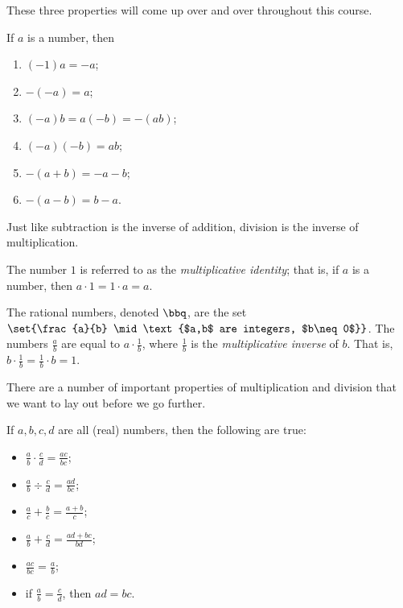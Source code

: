\documentclass[boxes,serif]{seastaralgebras_expository}
\renewcommand{\sth}{\mid}
\begin{document}
These three properties will come up over and over throughout this course.

\begin{proper} \label{proper:negative}
    If $a$ is a number, then
    \begin{enumerate}
        \item $(-1)a=-a$;
        \item $-(-a)=a$;
        \item $(-a)b = a(-b)=-(ab)$;
        \item $(-a)(-b)=ab$;
        \item $-(a+b) = -a-b$;
        \item $-(a-b) = b-a$.
    \end{enumerate}
\end{proper}

Just like subtraction is the inverse of addition, division is the inverse of multiplication.

\begin{defn} \label{def:one}
    The number $1$ is referred to as the \emph{multiplicative identity}; that is, if $a$ is a number, then $a\cdot 1 = 1 \cdot a = a$.
\end{defn}

\begin{defn} \label{def:rational}
    The rational numbers, denoted $\bbq$, are the set $\set{\frac{a}{b} \sth \text{$a,b$ are integers, $b\neq0$}}$. The numbers $\frac{a}{b}$ are equal to $a \cdot \frac{1}{b}$, where $\frac{1}{b}$ is the \emph{multiplicative inverse} of $b$. That is, $b \cdot \frac{1}{b} = \frac{1}{b} \cdot b = 1$.
\end{defn}

There are a number of important properties of multiplication and division that we want to lay out before we go further.

\begin{proper} \label{proper:division}
    If $a,b,c,d$ are all (real) numbers, then the following are true:
    \begin{itemize}
        \item $\frac{a}{b} \cdot \frac{c}{d} = \frac{ac}{bc}$;
        \item $\frac{a}{b} \div \frac{c}{d} = \frac{ad}{bc}$;
        \item $\frac{a}{c}+\frac{b}{c} = \frac{a+b}{c}$;
        \item $\frac{a}{b}+\frac{c}{d} = \frac{ad+bc}{bd}$;
        \item $\frac{ac}{bc}=\frac{a}{b}$;
        \item if $\frac{a}{b}=\frac{c}{d}$, then $ad=bc$.
    \end{itemize}
\end{proper}
\end{document}

